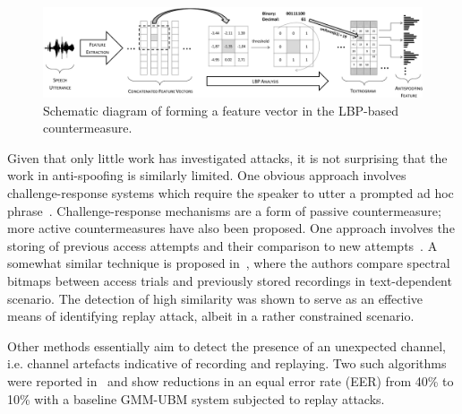 


\begin{figure}
	\includegraphics[width=1\linewidth]{Figs/LBPfeature.pdf}

	\caption{Schematic diagram of forming a feature vector in the LBP-based countermeasure.}
	\label{fig:LBPfeature}
\end{figure}




Given that only little work has investigated attacks, it is not surprising that the work in anti-spoofing is similarly limited.  
One obvious approach involves challenge-response systems which require the speaker to utter a prompted ad hoc phrase~\cite{Petrovska1998}. 
Challenge-response mechanisms are a form of passive countermeasure; more active countermeasures have also been proposed.
One approach involves the storing of previous access attempts and their comparison to new attempts~\cite{Shang2010}. A somewhat similar technique is proposed in~\cite{Wu2014}, where the authors compare spectral bitmaps between access trials and previously stored recordings in text-dependent scenario.
The detection of high similarity was shown to serve as an effective means of identifying replay attack, albeit in a rather constrained scenario.

Other methods 
essentially aim to detect the presence of an unexpected channel, i.e. channel artefacts indicative of recording and replaying.
Two such algorithms were reported in~\cite{Wang2011} and show reductions in 
an equal error rate (EER) from 40\% to 10\% with a baseline GMM-UBM system subjected to replay attacks.

